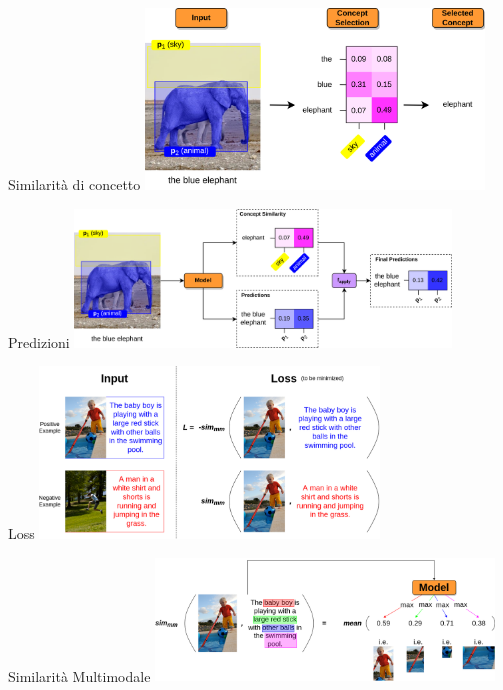 \documentclass{beamer}
\begin{document}
\begin{frame}{Similarità di concetto}
  \centering
  \includegraphics[width=9cm]{images/concept-selection-example.png}
\end{frame}

\begin{frame}{Predizioni}
  \centering
  \includegraphics[width=10cm]{images/predictions.png}
\end{frame}

\begin{frame}{Loss}
  \centering
  \includegraphics[width=9cm]{images/loss.png}
\end{frame}

\begin{frame}{Similarità Multimodale}
  \centering
  \includegraphics[width=9cm]{images/sim-mm.png}
\end{frame}
\end{document}
